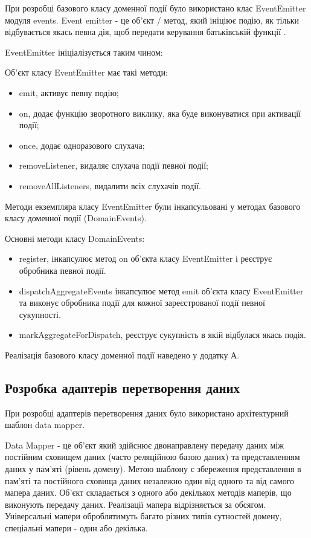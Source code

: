При розробці базового класу доменної події було використано клас EventEmitter модуля events.
Event emitter - це об'єкт / метод, який ініціює подію, як тільки відбувається якась певна дія,
щоб передати керування батьківській функції \cite{event-emitter-doc}.

EventEmitter ініціалізується таким чином:


Об'єкт класу EventEmitter має такі методи:

\begin{itemize}
    \item emit, активує певну подію;
    \item on, додає функцію зворотного виклику,
        яка буде виконуватися при активації події;
    \item once, додає одноразового слухача;
    \item removeListener, видаляє слухача події певної події;
    \item removeAllListeners, видалити всіх слухачів події.
\end{itemize}

Методи екземпляра класу EventEmitter були інкапсульовані 
у методах базового класу доменної події (DomainEvents).

Основні методи класу DomainEvents:

\begin{itemize}
    \item register, інкапсулює метод on об'єкта 
      класу EventEmitter і реєструє обробника певної події.
    \item dispatchAggregateEvents інкапсулює метод emit об'єкта
      класу EventEmitter та виконує обробника події для кожної
      зареєстрованої події певної сукупності.
    \item markAggregateForDispatch, реєструє сукупність в якій
      відбулася якась подія.
\end{itemize}

Реалізація базового класу доменної події наведено у додатку А.

\subsection{Розробка адаптерів перетворення даних}

При розробці адаптерів перетворення даних було використано 
архітектурний шаблон data mapper.

Data Mapper - це об'єкт який здійснює двонаправлену передачу даних між
постійним сховищем даних (часто реляційною базою даних)
та представленням даних у пам'яті (рівень домену).
Метою шаблону є збереження представлення в
пам'яті та постійного сховища даних незалежно один
від одного та від самого мапера даних.
Об'єкт складається з одного або декількох методів маперів,
що виконують передачу даних. Реалізації мапера відрізняється
за обсягом. Універсальні мапери оброблятимуть
багато різних типів сутностей домену,
спеціальні мапери - один або декілька.

